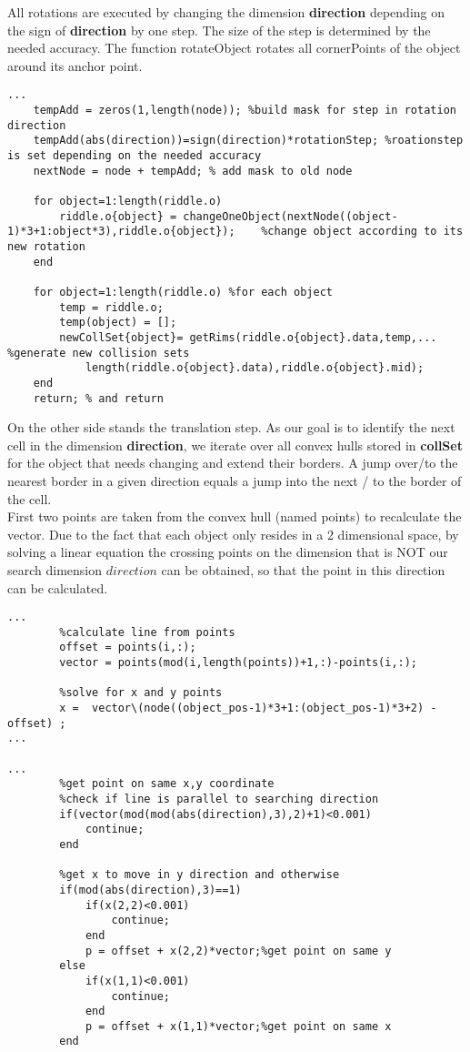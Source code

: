 All rotations are executed by changing the dimension \textbf{direction}  depending on the sign of \textbf{direction} by one step. The size of the step is determined 
by the needed accuracy. The function rotateObject rotates all cornerPoints of the object around its anchor point.\\
\begin{lstlisting}
...
    tempAdd = zeros(1,length(node)); %build mask for step in rotation direction
    tempAdd(abs(direction))=sign(direction)*rotationStep; %roationstep is set depending on the needed accuracy
    nextNode = node + tempAdd; % add mask to old node

    for object=1:length(riddle.o)
        riddle.o{object} = changeOneObject(nextNode((object-1)*3+1:object*3),riddle.o{object});    %change object according to its new rotation
    end
    
    for object=1:length(riddle.o) %for each object 
        temp = riddle.o;
        temp(object) = [];
        newCollSet{object}= getRims(riddle.o{object}.data,temp,... %generate new collision sets
            length(riddle.o{object}.data),riddle.o{object}.mid);
    end
    return; % and return
\end{lstlisting}
On the other side stands the translation step. As our goal is to identify the next cell in the dimension \textbf{direction}, we iterate over all convex hulls stored in \textbf{collSet} for the object that needs changing and extend their borders. A jump over/to the nearest border in a given direction equals a jump into the next / to the border of the cell.\\
First two points are taken from the convex hull (named points) to recalculate the vector. Due to the fact that each object only resides in a 2 dimensional space, by solving a linear equation the crossing points on the dimension that is NOT our search dimension $direction$ can be obtained, so that the point in this direction can be calculated.
\begin{lstlisting}
...
        %calculate line from points
        offset = points(i,:);
        vector = points(mod(i,length(points))+1,:)-points(i,:);

        %solve for x and y points
        x =  vector\(node((object_pos-1)*3+1:(object_pos-1)*3+2) - offset) ;
...    
    
...        
        %get point on same x,y coordinate
        %check if line is parallel to searching direction
        if(vector(mod(mod(abs(direction),3),2)+1)<0.001)
            continue;
        end

        %get x to move in y direction and otherwise
        if(mod(abs(direction),3)==1)
            if(x(2,2)<0.001)
                continue;
            end
            p = offset + x(2,2)*vector;%get point on same y
        else
            if(x(1,1)<0.001)
                continue;
            end
            p = offset + x(1,1)*vector;%get point on same x
        end
 \end{lstlisting}
